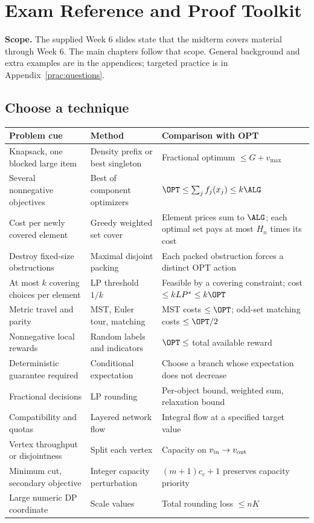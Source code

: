 \section{Exam Reference and Proof Toolkit}
\label{ref:toolkit}
\textbf{Scope.} The supplied Week 6 slides state that the midterm covers material through
Week 6. The main chapters follow that scope. General background and extra examples are
in the appendices; targeted practice is in Appendix~\ref{prac:questions}.

\subsection{Choose a technique}
\begin{center}
\small
\begin{tabular}{P{0.25\textwidth}P{0.29\textwidth}P{0.35\textwidth}}
\toprule
\textbf{Problem cue} & \textbf{Method} & \textbf{Comparison with OPT}\\
\midrule
Knapsack, one blocked large item & Density prefix or best singleton & Fractional optimum $\le G+v_{\max}$\\
Several nonnegative objectives & Best of component optimizers & $\OPT\le\sum_j f_j(x_j)\le k\ALG$\\
Cost per newly covered element & Greedy weighted set cover & Element prices sum to $\ALG$; each optimal set pays at most $H_n$ times its cost\\
Destroy fixed-size obstructions & Maximal disjoint packing & Each packed obstruction forces a distinct OPT action\\
At most $k$ covering choices per element & LP threshold $1/k$ & Feasible by a covering constraint; cost $\le kLP^*\le k\OPT$\\
Metric travel and parity & MST, Euler tour, matching & MST costs $\le\OPT$; odd-set matching costs $\le\OPT/2$\\
Nonnegative local rewards & Random labels and indicators & $\OPT\le$ total available reward\\
Deterministic guarantee required & Conditional expectation & Choose a branch whose expectation does not decrease\\
Fractional decisions & LP rounding & Per-object bound, weighted sum, relaxation bound\\
Compatibility and quotas & Layered network flow & Integral flow at a specified target value\\
Vertex throughput or disjointness & Split each vertex & Capacity on $v_{\rm in}\to v_{\rm out}$\\
Minimum cut, secondary objective & Integer capacity perturbation & $(m+1)c_e+1$ preserves capacity priority\\
Large numeric DP coordinate & Scale values & Total rounding loss $\le nK$\\
\bottomrule
\end{tabular}
\end{center}

